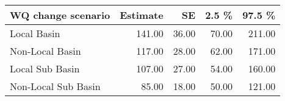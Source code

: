 \begin{table}[ht]
\centering
\begin{tabular}{lrrrr}
  \hline
WQ change scenario & Estimate & SE & 2.5 \% & 97.5 \% \\ 
  \hline
Local Basin & 141.00 & 36.00 & 70.00 & 211.00 \\ 
  Non-Local Basin & 117.00 & 28.00 & 62.00 & 171.00 \\ 
  Local Sub Basin & 107.00 & 27.00 & 54.00 & 160.00 \\ 
  Non-Local Sub Basin & 85.00 & 18.00 & 50.00 & 121.00 \\ 
   \hline
\end{tabular}
\end{table}
